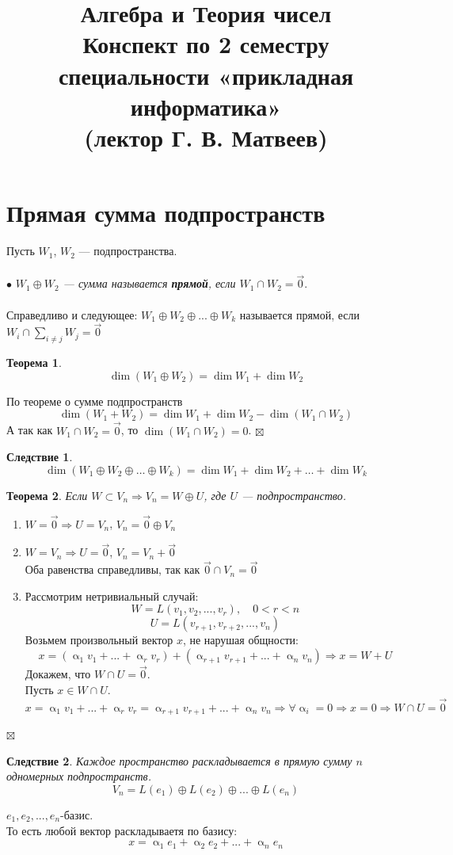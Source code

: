 \documentclass[a4paper, 12pt]{article}
\title{\vspace{6.5cm}\textbf{\Huge{Алгебра и Теория чисел}}\\Конспект по 2 семестру 
	специальности «прикладная информатика»\\(лектор Г. В. Матвеев)}
\date{}
\newtheorem*{theorem}{Теорема}
\newtheorem*{corollary}{Следствие}
\newenvironment{Proof}
{\par\noindent{$\blacklozenge$}}
{\hfill$\scriptstyle\boxtimes$}
\renewcommand{\alpha}{\upalpha}
\begin{document}
	\maketitle
	\newpage
	\tableofcontents{}
	\newpage
\section{Прямая сумма подпространств}
Пусть $W_1$, $W_2$ --- подпространства.\\\\
$\bullet$ \textit{$W_1 \oplus W_2$ --- сумма называется \textbf{прямой}, если $W_1 \cap W_2 = \vec0$}.\\\\
Справедливо и следующее: $W_1 \oplus W_2 \oplus ... \oplus W_k$ называется прямой, если $W_i \cap \sum\limits_{i \neq j} W_j = \vec 0$
\begin{theorem}
    $$\dim(W_1 \oplus W_2) = \dim W_1 + \dim W_2$$
\end{theorem}
\begin{Proof}
    По теореме о сумме подпространств $$\dim(W_1+W_2)=\dim W_1+\dim W_2-\dim(W_1 \cap W_2)$$
    А так как $W_1 \cap W_2 = \vec0$, то $\dim(W_1 \cap W_2)=0$.
\end{Proof}
\begin{corollary}
	$$\dim(W_1 \oplus W_2 \oplus \ldots \oplus W_k) = \dim W_1 + \dim W_2 + \ldots + \dim W_k$$
\end{corollary}
\begin{theorem}
    Если $W \subset V_n \Rightarrow V_n = W \oplus U$, где $U$ --- подпространство.
\end{theorem} 
\begin{Proof}
    \begin{enumerate}
        \item $W = \vec0 \Rightarrow U = V_n$, $V_n = \vec0 \oplus V_n$
        \item $W = V_n \Rightarrow U = \vec0$, $V_n = V_n + \vec0$\\
        Оба равенства справедливы, так как $\vec0 \cap V_n = \vec0$
        \item Рассмотрим нетривиальный случай:
        $$W = L(v_1, v_2,...,v_r), \quad 0<r<n$$
        $$U = L(v_{r+1},v_{r+2},...,v_n)$$
        Возьмем произвольный вектор $x$, не нарушая общности:
        $$x=(\alpha_1v_1+...+\alpha_rv_r)+(\alpha_{r+1}v_{r+1}+...+\alpha_nv_n) \Rightarrow x=W+U$$
        Докажем, что $W \cap U = \vec0$.\\
        Пусть $x \in W \cap U$.
        $$x=\alpha_1v_1+...+\alpha_rv_r=\alpha_{r+1}v_{r+1}+...+\alpha_nv_n \Rightarrow \forall \alpha_i = 0 \Rightarrow x = 0 \Rightarrow W \cap U = \vec0$$
    \end{enumerate}
\end{Proof}
\begin{corollary}
	Каждое пространство раскладывается в прямую сумму $n$ одномерных подпространств.
	$$V_n=L(e_1) \oplus L(e_2) \oplus ... \oplus L(e_n)$$ 
\end{corollary}
$e_1,e_2, ... ,e_n$-базис.\\
То есть любой вектор раскладываетя по базису:
$$x=\alpha_1e_1+\alpha_2e_2+ ... + \alpha_ne_n$$
\end{document}
